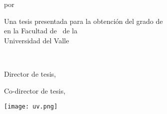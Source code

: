 \maketitle

\thispagestyle{empty}
\longvertspacing{}
\begin{tightcenter}
  por
\end{tightcenter}
\mylinespacing{}
\begin{tightcenter}
  \myname{}
\end{tightcenter}
\longvertspacing{}
\begin{tightcenter}
  Una tesis presentada para la obtención del grado de \degreetype\\
  en la Facultad de  \myprogram~de la  \\
  Universidad del Valle
\end{tightcenter}
\mylinespacing{}
\begin{tightcenter}
  \mymonth~\myyear{}
\end{tightcenter}
\mylinespacing{}
\begin{tightcenter}
  Director de tesis, \myadvisor{}
\end{tightcenter}
\begin{tightcenter}
  Co-director de tesis, \committeememberA{}
\end{tightcenter}
\vspace{8mm}
\begin{tightcenter}
  \begin{minipage}{0.11\textwidth}
    \texttt{[image: uv.png]}
  \end{minipage}
\end{tightcenter}
